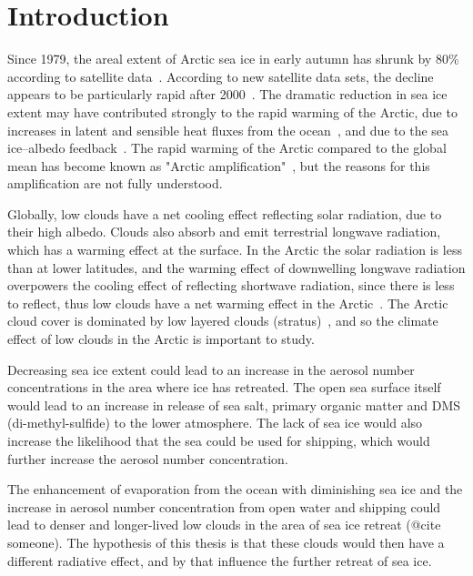 \chapter{Introduction}
\label{chap:introduction}
Since 1979, the areal extent of Arctic sea ice in early autumn has shrunk by 80\% according to satellite data~\citep{NSIDC}. According to new satellite data sets, the decline appears to be particularly rapid after 2000~\citep{Wu2012}. The dramatic reduction in sea ice extent may have contributed strongly to the rapid warming of the Arctic, due to increases in latent and sensible heat fluxes from the ocean~\citep{Screen2010}, and due to the sea ice--albedo feedback~\citep{Curry1995a}. The rapid warming of the Arctic compared to the global mean has become known as "Arctic amplification"~\citep{Graversen2008}, but the reasons for this amplification are not fully understood.

Globally, low clouds have a net cooling effect reflecting solar radiation, due to their high albedo. Clouds also absorb and emit terrestrial longwave radiation, which has a warming effect at the surface. In the Arctic the solar radiation is less than at lower latitudes, and the warming effect of downwelling longwave radiation overpowers the cooling effect of reflecting shortwave radiation, since there is less to reflect, thus low clouds have a net warming effect in the Arctic~\citep{Shupe2004}. The Arctic cloud cover is dominated by low layered clouds (stratus)~\citep{Curry1996}, and so the climate effect of low clouds in the Arctic is important to study.

Decreasing sea ice extent could lead to an increase in the aerosol number concentrations in the area where ice has retreated. The open sea surface itself would lead to an increase in release of sea salt, primary organic matter and DMS (di-methyl-sulfide) to the lower atmosphere. The lack of sea ice would also increase the likelihood that the sea could be used for shipping, which would further increase the aerosol number concentration.

The enhancement of evaporation from the ocean with diminishing sea ice and the increase in aerosol number concentration from open water and shipping could lead to denser and longer-lived low clouds in the area of sea ice retreat (@cite someone). The  hypothesis of this thesis is that these clouds would then have a different radiative effect, and by that influence the further retreat of sea ice.

